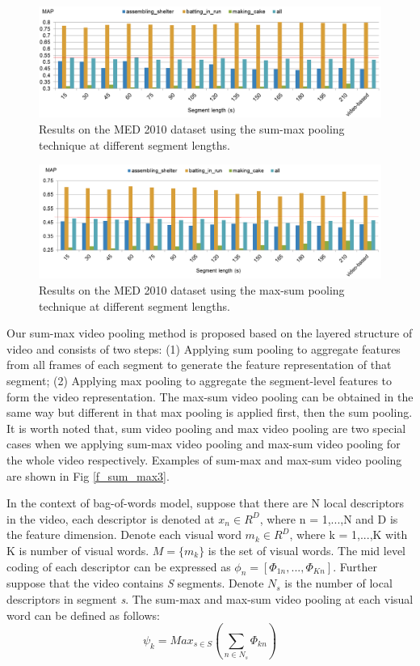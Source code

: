 \begin{figure}[!htb]
	\centering
	\includegraphics[width=1\textwidth]{sum_max_chart.png}
	\caption{Results on the MED 2010 dataset using the sum-max pooling technique at different segment lengths.}
	\label{f_sum_max_chart}
\end{figure}
\begin{figure}[!htb]
	\centering
	\includegraphics[width=1\textwidth]{max_sum_chart.png}
	\caption{Results on the MED 2010 dataset using the max-sum pooling technique at different segment lengths.}
	\label{f_max_sum_chart}
\end{figure}
Our sum-max video pooling method is proposed based on the layered structure of video and consists of two steps: (1) Applying sum pooling to aggregate features from all frames of each segment to generate the feature representation of that segment; (2) Applying max pooling to aggregate the segment-level features to form the video representation. The max-sum video pooling can be obtained in the same way but different in that max pooling is applied first, then the sum pooling. It is worth noted that, sum video pooling and max video pooling are two special cases when we applying sum-max video pooling and max-sum video pooling for the whole video respectively. Examples of sum-max and max-sum video pooling are shown in Fig \ref{f_sum_max3}. 

In the context of bag-of-words model, suppose that there are N local descriptors in the video, each descriptor is denoted at $x_{n} \in R^{D}$, where n = 1,...,N and D is the feature dimension. Denote each visual word $m_{k} \in R^{D}$, where k = 1,...,K with K is number of visual words. $M = \{m_{k}\}$ is the set of visual words. The mid level coding of each descriptor can be expressed as $\phi_{n} = [\Phi_{1n},...,\Phi_{Kn}]$. Further suppose that the video contains \textit{S} segments. Denote $N_{s}$ is the number of local descriptors in segment \textit{s}. The sum-max and max-sum video pooling at each visual word can be defined as follows:
\begin{equation}\psi_{k} = Max_{s \in S}(\sum_{n \in N_{s}}\Phi_{kn})\end{equation}

